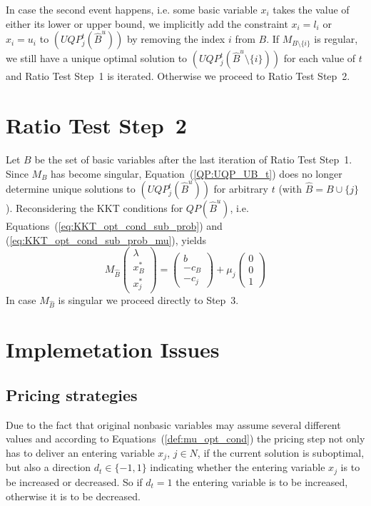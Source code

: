 \documentclass[a4paper]{article}
\begin{document}
In case the second event happens, i.e. some basic variable $x_{i}$ takes the
value of either its lower or upper bound, we implicitly add the constraint
$x_{i}=l_{i}$ or $x_{i}=u_{i}$ to $(UQP_{j}^{t}(\hat{B}^{u}))$ by removing the
index $i$ from $B$. If $M_{B\setminus \{i\}}$ is regular, we still have a unique
optimal solution to $(UQP_{j}^{t}(\hat{B}^{u} \setminus\{i\}))$ for each value
of $t$ and Ratio Test Step~1 is iterated.
Otherwise we proceed to Ratio Test Step~2.

\section{Ratio Test Step~2}
Let $B$ be the set of basic variables after the last iteration of Ratio Test
Step~1. Since $M_{B}$ has become singular, Equation~(\ref{QP:UQP_UB_t}) does no
longer determine unique solutions to $(UQP_{j}^{t}(\hat{B}^{u}))$ for arbitrary
$t$ (with $\hat{B}=B \cup \{j\}$). Reconsidering the KKT conditions for
$QP(\hat{B}^{u})$, i.e. Equations~(\ref{eq:KKT_opt_cond_sub_prob}) and
(\ref{eq:KKT_opt_cond_sub_prob_mu}), yields
\begin{equation}
M_{\hat{B}}
\left(
\begin{array}{c}
\lambda \\
\hline
x_{B}^{*} \\
\hline
x_{j}^{*}
\end{array}
\right)
=
\left(
\begin{array}{c}
b \\
\hline
-c_{B} \\
\hline
-c_{j}
\end{array}
\right)
+\mu_{j}
\left(
\begin{array}{c}
0 \\
\hline
0 \\
\hline
1
\end{array}
\right)
\end{equation}
In case $M_{\hat{B}}$ is singular we proceed directly to Step~3.

\section{Implemetation Issues}
\subsection{Pricing strategies}
Due to the fact that original nonbasic variables may assume several different values and according to Equations~(\ref{def:mu_opt_cond}) the pricing step not only has to deliver an entering variable $x_{j}$, $j \in N$, if the current solution is suboptimal, but also a direction $d_{t} \in \{-1,1\}$ indicating whether the entering variable $x_{j}$ is to be increased or decreased. So if $d_{t}=1$ the entering variable is to be increased, otherwise it is to be decreased.
\end{document}
